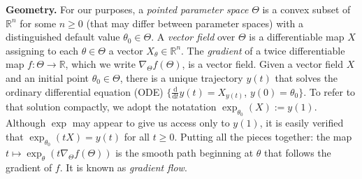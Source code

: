 \documentclass{article} %
\theoremstyle{plain}
\theoremstyle{definition}
\theoremstyle{remark}
\let\cite\citep
\DeclareMathOperator*{\Ex}{\mathbb{E}} %
\newcommand\mat[1]{\mathbf{#1}}
\newcommand\vfull[1]{}
\begin{document}
\textbf{Geometry.}
For our purposes, a \emph{pointed parameter space} $\Theta$ is a convex subset of $\mathbb R^n$ for some $n\ge0$
   (that may differ between parameter spaces) with a distinguished default value $\theta_0 \in \Theta$.
A \emph{vector field} over $\Theta$ is a differentiable
   map $X$ assigning to each $\theta \in \Theta$ a vector $X_\theta \in \mathbb R^n$.
The \emph{gradient} of a twice differentiable map $f : \Theta \to \mathbb R$,
   which we write $\nabla_\Theta f(\Theta)$, is a vector field.
Given a vector field  $X$ and an initial point $\theta_0 \in \Theta$, there is a unique trajectory $y(t)$ that solves the ordinary differential equation (ODE)
$\{\frac{\mathrm d }{\mathrm d t}y(t) = X_{y(t)}$,  $y(0) = \theta_0\}$.
To refer to that solution compactly, we adopt the notatation $\exp_{\theta_0}( X ) := y(1)$.
Although $\exp$ may appear to give us access only to $y(1)$,
    it is easily verified
    that $\exp_{\theta_0}(t X) = y(t)$ for all $t \ge 0$.
Putting all the pieces together: the map $t\mapsto \exp_\theta(t \nabla_\Theta f(\Theta))$ is the smooth path beginning at $\theta$ that follows the gradient of $f$. It is known as
\emph{gradient flow}.

\vfull{
Given a manifold $\Theta$ and a differentiable map $P : \Theta \to \Delta \V\! X$,
    the Fisher Information Matrix
$\mathcal I(\theta)
$
at each $\theta \in \Theta$
gives rise to a Riemannian metric;
thus the mere fact that $\Theta$ parameterizes a family of
probability distributions is enough to make it a Riemannian manifold.
Moreover, $\mathcal I(\theta)$ is particularly natural in a probabilistic context;
   up to a multiplicative constant, it is the \emph{only} such metric on $\Theta$ that is invariant under sufficient statistics, \cite{chentsov}. \cite{infogoem}
}
\end{document}
